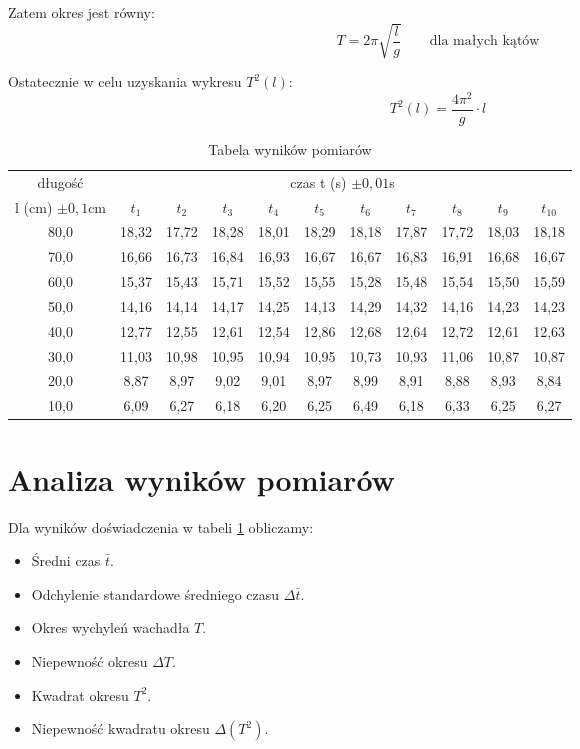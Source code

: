 \documentclass[a4paper,12pt]{article}
\begin{document}
Zatem okres jest równy:
\begin{equation}
		T = 2\pi \sqrt{\frac{l}{g}} \qquad \text{dla małych kątów}
		\label{eq:okres}
\end{equation}

Ostatecznie w celu uzyskania wykresu $T^2 \left(l\right)$:
\begin{equation}
		T^2\left( l \right) = \frac{4\pi^2}{g}  \cdot l
		\label{eq:wykres}
\end{equation}

\begin{table}[h]
		\centering
		\footnotesize{
		\begin{tabular}{|c|c|c|c|c|c|c|c|c|c|c|}
				\hline
	długość             &\multicolumn{10}{c|}{czas t (s) $\pm 0,01$s} \\ \cline{2-11}
	l (cm) $\pm 0,1$cm	& $t_1$ & $t_2$ & $t_3$ & $t_4$ & $t_5$ & $t_6$ & $t_7$ & $t_8$ & $t_9$ & $t_{10}$\\ \hline
		  80,0  & 18,32 & 17,72 & 18,28 & 18,01 & 18,29 & 18,18 & 17,87 & 17,72 & 18,03 & 18,18\\
		  70,0  & 16,66 & 16,73 & 16,84 & 16,93 & 16,67 & 16,67 & 16,83 & 16,91 & 16,68 & 16,67\\
		  60,0  & 15,37 & 15,43 & 15,71 & 15,52 & 15,55 & 15,28 & 15,48 & 15,54 & 15,50 & 15,59\\
		  50,0  & 14,16 & 14,14 & 14,17 & 14,25 & 14,13 & 14,29 & 14,32 & 14,16 & 14,23 & 14,23\\
		  40,0  & 12,77 & 12,55 & 12,61 & 12,54 & 12,86 & 12,68 & 12,64 & 12,72 & 12,61 & 12,63\\
		  30,0  & 11,03 & 10,98 & 10,95 & 10,94 & 10,95 & 10,73 & 10,93 & 11,06 & 10,87 & 10,87\\
		  20,0  & 8,87 & 8,97 & 9,02 & 9,01 & 8,97 & 8,99 & 8,91 & 8,88 & 8,93 & 8,84\\
		  10,0  & 6,09 & 6,27 & 6,18 & 6,20 & 6,25 & 6,49 & 6,18 & 6,33 & 6,25 & 6,27\\\hline
\end{tabular}
}
		\caption{Tabela wyników pomiarów}
		\label{tab:pomiar}
\end{table}

\section{Analiza wyników pomiarów}

Dla wyników doświadczenia w tabeli \ref{tab:pomiar} obliczamy:
\begin{itemize}
		\item Średni czas $\bar{t}$.
		\item Odchylenie standardowe średniego czasu $\Delta \bar{t}$.
		\item Okres wychyleń wachadła $T$.
		\item Niepewność okresu $\Delta T$.
		\item Kwadrat okresu $T^2$.
		\item Niepewność kwadratu okresu $\Delta \left( T^2 \right)$.

\end{itemize}
\end{document}
